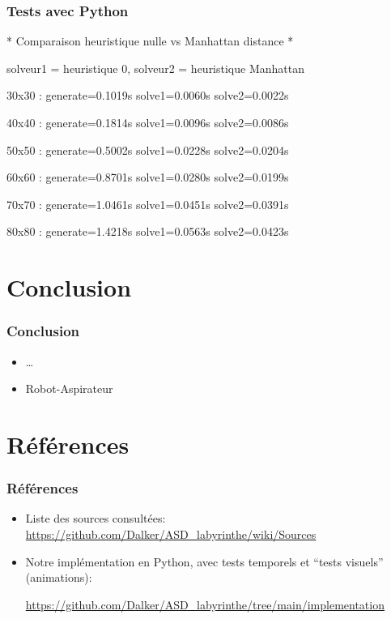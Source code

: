 \documentclass{beamer}
\begin{document}
\begin{frame}
  \frametitle{Tests avec Python}
  \begin{semiverbatim}
    * Comparaison heuristique nulle vs Manhattan distance *
    
    solveur1 = heuristique 0, solveur2 = heuristique Manhattan
    
    30x30  : generate=0.1019s solve1=0.0060s solve2=0.0022s
    
    40x40  : generate=0.1814s solve1=0.0096s solve2=0.0086s
    
    50x50  : generate=0.5002s solve1=0.0228s solve2=0.0204s
    
    60x60  : generate=0.8701s solve1=0.0280s solve2=0.0199s
    
    70x70  : generate=1.0461s solve1=0.0451s solve2=0.0391s
    
    80x80  : generate=1.4218s solve1=0.0563s solve2=0.0423s
  \end{semiverbatim}
\end{frame}

\section{Conclusion}
\begin{frame}
  \frametitle{Conclusion}
  \begin{itemize}
  \item \ldots
  \item Robot-Aspirateur
  \end{itemize}
\end{frame}

\section{Références}
\begin{frame}
  \frametitle{Références}
  \begin{itemize}
  \item Liste des sources consultées:
    \url{https://github.com/Dalker/ASD_labyrinthe/wiki/Sources}
  \item Notre implémentation en Python, avec tests temporels et ``tests
    visuels'' (animations):
    
    \url{https://github.com/Dalker/ASD_labyrinthe/tree/main/implementation}
  \end{itemize}
\end{frame}
\end{document}
